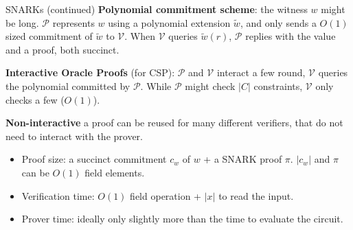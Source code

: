 \documentclass[10pt]{beamer}
\begin{document}
\begin{frame}{SNARKs (continued)}
\textbf{Polynomial commitment scheme}: the witness $w$ might be long. $\mathcal{P}$ represents $w$ using a polynomial extension $\tilde{w}$, and only sends a $O(1)$ sized commitment of $\tilde{w}$ to $\mathcal{V}$. When $\mathcal{V}$ queries $\tilde{w}(r)$, $\mathcal{P}$ replies with the value and a proof, both succinct. 

\textbf{Interactive Oracle Proofs} (for CSP): $\mathcal{P}$ and $\mathcal{V}$ interact a few round, $\mathcal{V}$ queries the polynomial committed by $\mathcal{P}$. While $\mathcal{P}$ might check $|C|$ constraints, $\mathcal{V}$ only checks a few ($O(1)$). 

\textbf{Non-interactive} a proof can be reused for many different verifiers, that do not need to interact with the prover. 

\begin{itemize}
    \item Proof size: a succinct commitment $c_w$ of $w$ + a SNARK proof $\pi$. $|c_w|$ and $\pi$ can be $O(1)$ field elements. 
    \item Verification time: $O(1)$ field operation + $|x|$ to read the input.
    \item Prover time: ideally only slightly more than the time to evaluate the circuit.  
\end{itemize}
\end{frame}
\end{document}
